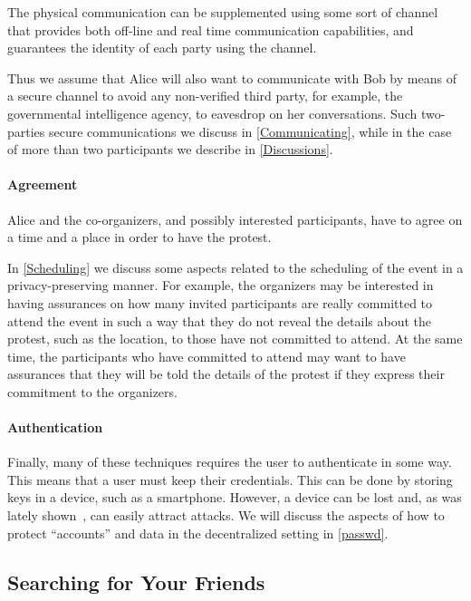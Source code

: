 The physical communication can be supplemented using some sort of channel that provides 
both off-line and real time communication capabilities, and guarantees the identity 
of each party using the channel.

Thus we assume that Alice will also want to communicate with Bob by means of a secure 
channel to avoid any non-verified third party, for example, the governmental intelligence 
agency, to eavesdrop on her conversations. Such two-parties secure communications 
we discuss in \cref{Communicating}, while in the case of more than two participants 
we describe in \cref{Discussions}.

\paragraph{Agreement}
Alice and the co-organizers, and possibly interested participants, have to agree 
on a time and a place in order to have the protest.

In \cref{Scheduling} we discuss some aspects related to the scheduling of the event 
in a privacy-preserving manner. For example, the organizers may be interested in 
having assurances on how many invited participants are really committed to attend 
the event in such a way that they do not reveal the details about the protest, such 
as the location, to those have not committed to attend. At the same time, the participants 
who have committed to attend may want to have assurances that they will be told 
the details of the protest if they express their commitment to the organizers.

\paragraph{Authentication}
Finally, many of these techniques requires the user to authenticate in some 
way.
This means that a user must keep their credentials.
This can be done by storing keys in a device, such as a smartphone.
However, a device can be lost and, as was lately shown~\cite{AppleVsFBI}, can 
easily attract attacks.
We will discuss the aspects of how to protect \enquote{accounts} and data in 
the decentralized setting in \cref{passwd}.



\subsection{Searching for Your Friends}
\label{UserSearch}

